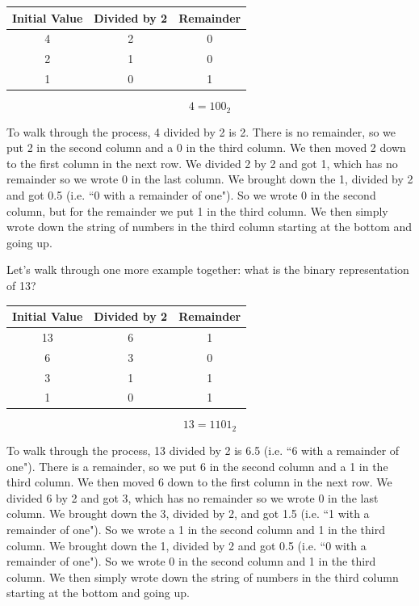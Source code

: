 \begin{center}
\begin{tabular}{|c|c|c|}
\hline
\textbf{Initial Value} & \textbf{Divided by 2} & \textbf{Remainder} \\
\hline
  4 &   2 & 0 \\
  2 &   1 & 0 \\
  1 &   0 & 1 \\
\hline
\end{tabular}
\end{center}

$$4 = 100_2$$

To walk through the process, 4 divided by 2 is 2. There is no remainder, so we put 2 in the second column and a 0 in the third column. We then moved 2 down to the first column in the next row. We divided 2 by 2 and got 1, which has no remainder so we wrote 0 in the last column. We brought down the 1, divided by 2 and got 0.5 (i.e. ``0 with a remainder of one"). So we wrote 0 in the second column, but for the remainder we put 1 in the third column. We then simply wrote down the string of numbers in the third column starting at the bottom and going up. 

Let's walk through one more example together: what is the binary representation of 13? 

\begin{center}
\begin{tabular}{|c|c|c|}
\hline
\textbf{Initial Value} & \textbf{Divided by 2} & \textbf{Remainder} \\
\hline
  13 &   6 & 1 \\
  6 &   3 & 0 \\
  3 &   1 & 1 \\
  1 &   0 & 1 \\
\hline
\end{tabular}
\end{center}

$$13 = 1101_2$$

To walk through the process, 13 divided by 2 is 6.5 (i.e. ``6 with a remainder of one"). There is a remainder, so we put 6 in the second column and a 1 in the third column. We then moved 6 down to the first column in the next row. We divided 6 by 2 and got 3, which has no remainder so we wrote 0 in the last column. We brought down the 3, divided by 2, and got 1.5 (i.e. ``1 with a remainder of one"). So we wrote a 1 in the second column and 1 in the third column. We brought down the 1, divided by 2 and got 0.5 (i.e. ``0 with a remainder of one"). So we wrote 0 in the second column and 1 in the third column. We then simply wrote down the string of numbers in the third column starting at the bottom and going up. 

